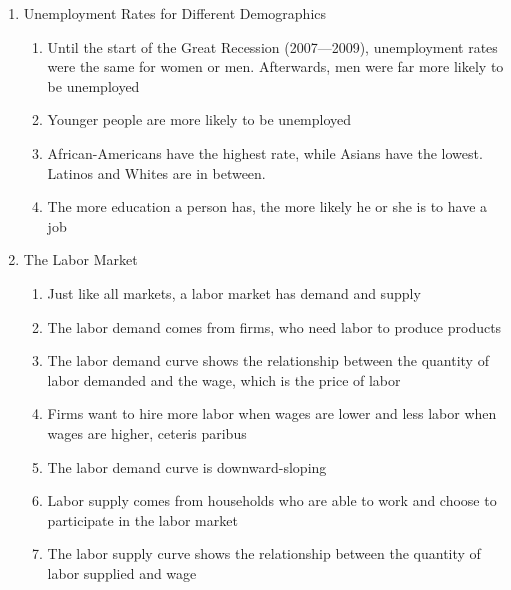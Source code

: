 \documentclass[12pt]{article}
\begin{document}
\begin{enumerate}
\begin{enumerate}
        \end{enumerate}

      \item Unemployment Rates for Different Demographics

        \begin{enumerate}

          \item Until the start of the Great Recession (2007—2009), unemployment rates were the same for women or men. Afterwards, men were far more likely to be unemployed

          \item Younger people are more likely to be unemployed

          \item African-Americans have the highest rate, while Asians have the lowest. Latinos and Whites are in between.

          \item The more education a person has, the more likely he or she is to have a job

        \end{enumerate}

      \item The Labor Market

        \begin{enumerate}
            
          \item Just like all markets, a labor market has demand and supply

          \item The labor demand comes from firms, who need labor to produce products

          \item The labor demand curve shows the relationship between the quantity of labor demanded and the wage, which is the price of labor

          \item Firms want to hire more labor when wages are lower and less labor when wages are higher, ceteris paribus

          \item The labor demand curve is downward-sloping

          \item Labor supply comes from households who are able to work and choose to participate in the labor market

          \item The labor supply curve shows the relationship between the quantity of labor supplied and wage


\end{enumerate}
\end{enumerate}
\end{document}
